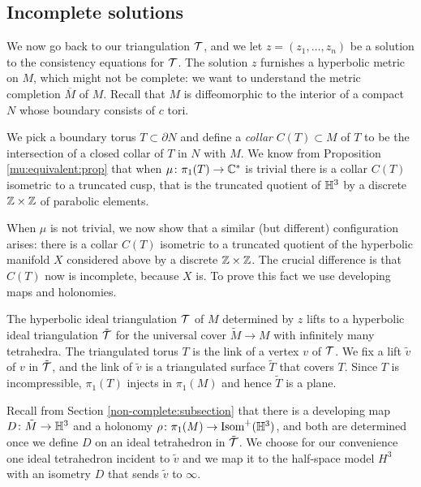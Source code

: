 \subsection{Incomplete solutions}
We now go back to our triangulation $\mathcal{T}$, and we let $z = (z_1, \ldots, z_n)$ be a solution to the consistency equations for $\mathcal{T}$. The solution $z$ furnishes a hyperbolic metric on $M$, which might not be complete: we want to understand the metric completion $\overline M$ of $M$. Recall that $M$ is diffeomorphic to the interior of a compact $N$ whose boundary consists of $c$ tori.

We pick a boundary torus $T\subset \partial N$ and define a \emph{collar} $C(T)\subset M$ of $T$ to be the intersection of a closed collar of $T$ in $N$ with $M$. We know from Proposition \ref{mu:equivalent:prop} that when $\mu\colon \pi_1(T) \to \mathbb{C}^*$ is trivial there is a collar $C(T)$ isometric to a truncated cusp, that is the truncated quotient of $\mathbb{H}^3$ by a discrete $\mathbb{Z} \times \mathbb{Z}$ of parabolic elements.

When $\mu$ is not trivial, we now show that a similar (but different) configuration arises: there is a collar $C(T)$ isometric to a truncated quotient of the hyperbolic manifold $X$ considered above by a discrete $\mathbb{Z} \times \mathbb{Z}$. The crucial difference is that $C(T)$ now is incomplete, because $X$ is. To prove this fact we use developing maps and holonomies.

The hyperbolic ideal triangulation $\mathcal{T}$ of $M$ determined by $z$ lifts to a hyperbolic ideal triangulation $\tilde {\mathcal{T}}$ for the universal cover $\tilde M \to M$ with infinitely many tetrahedra. The triangulated torus $T$ is the link of a vertex $v$ of $\mathcal{T}$. We fix a lift $\tilde v$ of $v$ in $\tilde {\mathcal{T}}$, and the link of $\tilde v$ is a triangulated surface $\tilde T$ that covers $T$. Since $T$ is incompressible, $\pi_1(T)$ injects in $\pi_1(M)$ and hence $\tilde T$ is a plane.

Recall from Section \ref{non-complete:subsection} that there is a developing map $D\colon \tilde {M} \to \mathbb{H}^3$ and a holonomy $\rho\colon \pi_1(M) \to {\rm Isom}^+(\mathbb{H}^3)$, and both are determined once we define $D$ on an ideal tetrahedron in $\tilde{\mathcal{T}}$. We choose for our convenience one ideal tetrahedron incident to $\tilde v$ and we map it to the half-space model $H^3$ with an isometry $D$ that sends $\tilde v$ to $\infty$. 

